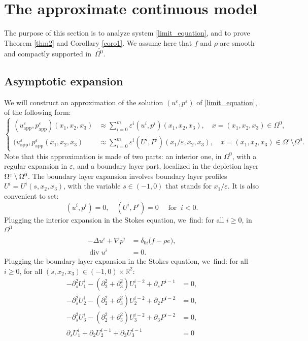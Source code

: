 \documentclass[JEP,XML,SOM,Unicode,NoEqCountersInSection,published]{cedram}
\newcommand{\app}{\mathrm{app}}
\renewcommand{\div}{\operatorname{div}}
\theoremstyle{plain}
\theoremstyle{definition}
\let\pa\partial
\let\na\nabla
\let\eps\varepsilon
\newcommand{\R}{\mathbb{R}}
\begin{document}
\section{The approximate continuous model} \label{sec_wall_law}The purpose of this section is to analyze system \eqref{limit_equation}, and to prove Theorem \ref{thm2} and Corollary \ref{coro1}. We assume here that $f$ and $\rho$ are smooth and compactly supported in~$\overline{\Omega^0}$.

\subsection{Asymptotic expansion}
We will construct an approximation of the solution $(u^\eps,p^\eps)$ of \eqref{limit_equation}, of the following form:
\begin{equation*}
\left\{
\begin{aligned}
(u^\eps_{\app},p^\eps_{\app})(x_1,x_2,x_3) & \approx \sum_{i=0}^m \eps^i (u^i, p^i)(x_1,x_2,x_3), \quad x = (x_1,x_2,x_3) \in \Omega^0, \\
(u^\eps_{\app}, p^\eps_{\app}(x_1,x_2,x_3) & \approx \sum_{i=0}^m \eps^i (U^i, P^i)(x_1/\eps,x_2,x_3), \quad x = (x_1,x_2,x_3) \in \Omega^\eps\setminus\Omega^0.
\end{aligned}
\right.
\end{equation*}
Note that this approximation is made of two parts: an interior one, in $\Omega^0$, with a regular expansion in $\eps$, and a boundary layer part, localized in the depletion layer $\Omega^\eps \setminus\nobreak \Omega^0$. The boundary layer expansion involves boundary layer profiles $U^i = U^i(s,x_2,x_3)$, with the variable $s \in (-1,0)$ that stands for
$x_1/\eps$. It is also convenient to set:
\[
(u^i, p^i)= 0, \quad (U^i, P^i) = 0 \quad \text{ for } \: i < 0.
\]
Plugging the interior expansion in the Stokes equation, we~find: for all $i \ge 0$, in $\Omega^0$
\begin{equation} \label{stokesint}
\begin{aligned}
-\Delta u^i + \na p^i & = \delta_{0i} \big(f - \rho e \big), \\
\div u^i & = 0.
\end{aligned}
\end{equation}
Plugging the boundary layer expansion in the Stokes equation, we~find: for all $i \ge 0$, for all $(s,x_2,x_3) \in (-1,0) \times \R^2$:
\begin{align}
-\pa^2_s U^i_1 - (\pa^2_2 + \pa^2_3) U^{i-2}_1 + \pa_s P^{i-1} & = 0, \label{stokesx} \\
-\pa^2_s U^i_2 - (\pa^2_2 + \pa^2_3) U^{i-2}_2 + \pa_2 P^{i-2} & = 0, \label{stokesy}\\
-\pa^2_s U^i_3 - (\pa^2_2 + \pa^2_3) U^{i-2}_3 + \pa_3 P^{i-2} & = 0, \label{stokesz} \\
\pa_s U^i_1 + \pa_2 U^{i-1}_2 + \pa_3 U^{i-1}_3 & = 0 \label{stokesdiv}
\end{align}
\end{document}
